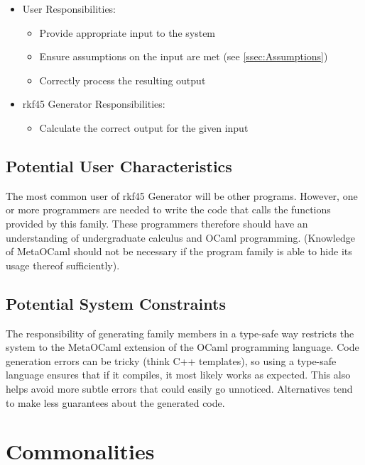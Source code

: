 \documentclass[12pt]{article}
\newcommand{\famname}{rkf45 Generator} %
\begin{document}
\begin{itemize}
\item User Responsibilities:
\begin{itemize}
\item Provide appropriate input to the system
\item Ensure assumptions on the input are met (see \autoref{ssec:Assumptions})
\item Correctly process the resulting output
\end{itemize}
\item \famname{} Responsibilities:
\begin{itemize}
\item Calculate the correct output for the given input
\end{itemize}
\end{itemize}

\subsection{Potential User Characteristics} \label{SecUserCharacteristics}

The most common user of \famname{} will be other programs. However, one or more 
programmers are needed to write the code that calls the functions provided by 
this family.
These programmers therefore should have an understanding of undergraduate 
calculus and OCaml programming. (Knowledge of MetaOCaml should not be necessary 
if the program family is able to hide its usage thereof sufficiently).
                                                                                
                          
\subsection{Potential System Constraints}

The responsibility of generating family members in a type-safe way restricts 
the system to the MetaOCaml extension of the OCaml programming language.
Code generation errors can be tricky (think C++ templates), so using a 
type-safe language ensures that if it compiles, it most likely works as 
expected.
This also helps avoid more subtle errors that could easily go unnoticed.
Alternatives tend to make less guarantees about the generated code.
\section{Commonalities}
\end{document}
